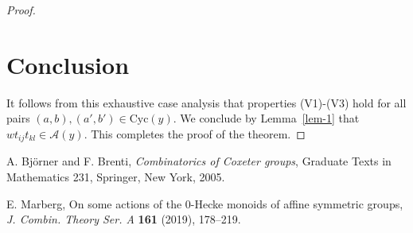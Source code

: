 \documentclass[10pt]{article}
\theoremstyle{definition}
\theoremstyle{definition}
\def\Cyc{\mathrm{Cyc}}
\def\cA{\mathcal{A}}
\begin{document}
\begin{proof}
\section{Conclusion}
It follows from this exhaustive case analysis
that properties (V1)-(V3) hold for all pairs $(a,b),(a',b') \in \Cyc(y)$.
We conclude by Lemma~\ref{lem-1} that $wt_{ij}t_{kl} \in \cA(y)$.
This completes the proof of the theorem.
\end{proof}

\begin{thebibliography}{99}

 A. Bj\"orner and F. Brenti,
\emph{Combinatorics of Coxeter groups},
Graduate Texts in Mathematics 231, Springer, New York, 2005.

 E. Marberg,
On some actions of the $0$-Hecke monoids of affine symmetric groups,
\emph{J. Combin. Theory Ser. A} \textbf{161} (2019), 178--219.

\end{thebibliography}
\end{document}
